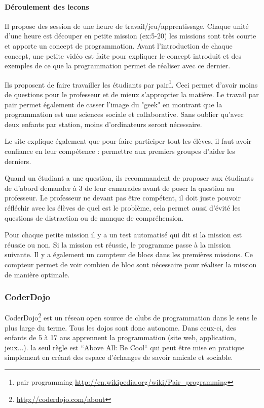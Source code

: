 \paragraph{Déroulement des lecons}
Il propose des session de une heure de travail/jeu/apprentissage. Chaque unité d'une heure est découper en petite mission (ex:5-20) les missions sont très courte et apporte un concept de programmation. Avant l'introduction de chaque concept, une petite vidéo est faite pour expliquer le concept introduit et des exemples de ce que la programmation permet de réaliser avec ce dernier.

Ils proposent de faire travailler les étudiants par pair\footnote{pair programming \url{http://en.wikipedia.org/wiki/Pair\_programming}}. Ceci permet d'avoir moins de questions pour le professeur et de mieux s'approprier la matière. Le travail par pair permet également de casser l'image du "geek" en montrant que la programmation est une sciences sociale et collaborative. Sans oublier qu'avec deux enfants par station, moins d'ordinateurs seront nécessaire.

Le site explique également que pour faire participer tout les élèves, il faut avoir confiance en leur compétence : permettre aux premiers groupes d'aider les derniers.

Quand un étudiant a une question, ils recommandent de proposer aux étudiants de d'abord demander à 3 de leur camarades avant de poser la question au professeur. Le professeur ne devant pas être compétent, il doit juste pouvoir réfléchir avec les élèves de quel est le problème, cela permet aussi d'évité les questions de distraction ou de manque de compréhension.

Pour chaque petite mission il y a un test automatisé qui dit si la mission est réussie ou non. Si la mission est réussie, le programme passe à la mission suivante. Il y a également un compteur de blocs dans les premières missions. Ce compteur permet de voir combien de bloc sont nécessaire pour réaliser la mission de manière optimale.

\subsubsection{CoderDojo}
CoderDojo\footnote{\url{http://coderdojo.com/about}} est un réseau open source de clubs de programmation dans le sens le plus large du terme. Tous les dojos sont donc autonome.  Dans ceux-ci, des enfants de 5 à 17 ans apprennent la programmation (site web, application, jeux...). la seul règle est  “Above All: Be Cool“ qui peut être mise en pratique simplement en créant des espace d'échanges de savoir amicale et sociable.

